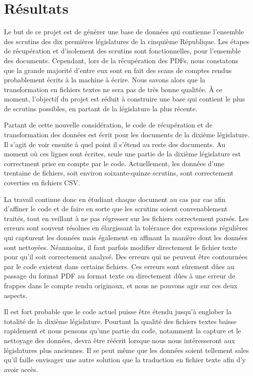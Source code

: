 \section{Résultats}

Le but de ce projet est de générer une base de données qui contienne l'ensemble des scrutins des dix premières législatures de la cinquième République. Les étapes de récupération et d'isolement des scrutins sont fonctionnelles, pour l'ensemble des documents. Cependant, lors de la récupération des PDFs, nous constatons que la grande majorité d'entre eux sont en fait des scans de comptes rendus probablement écrits à la machine à écrire. Nous savons alors que la transformation en fichiers textes ne sera pas de très bonne qualitée. À ce moment, l'objectif du projet est réduit à construire une base qui contient le plus de scrutins possibles, en partant de la législature la plus récente.

Partant de cette nouvelle considération, le code de récupération et de transformation des données est écrit pour les documents de la dixième législature. Il s'agit de voir ensuite à quel point il s'étend au reste des documents. Au moment où ces lignes sont écrites, seule une partie de la dixième législature est correctment prise en compte par le code. Actuellement, les données d'une trentaine de fichiers, soit environ soixante-quinze scrutins, sont correctement coverties en fichiers CSV.

La travail continue donc en étudiant chaque document au cas par cas afin d'affiner le code et de faire en sorte que les scrutins soient convenablement traités, tout en veillant à ne pas régresser sur les fichiers correctement parsés. Les erreurs sont souvent résolues en élargissant la tolérance des expressions régulières qui capturent les données mais également en affinant la manière dont les données sont nettoyées. Néanmoins, il faut parfois modifier directement le fichier texte pour qu'il soit correctement analysé. Des erreurs qui ne peuvent être contournées par le code existent dans certains fichiers. Ces erreurs sont sûrement dûes au passage du format PDF au format texte ou directement dûes à une erreur de frappes dans le compte rendu originaux, et nous ne pouvons agir sur ces deux aspects.

Il est fort probable que le code actuel puisse être étendu jusqu'à englober la totalité de la dixième législature. Pourtant la qualité des fichiers textes baisse rapidement et nous pensons qu'une partie du code, notamment la capture et le nettoyage des données, devra être réécrit lorsque nous nous intéresseront aux législatures plus anciennes. Il se peut même que les données soient tellement sales qu'il faille envisager une autre solution que la traduction en fichier texte afin d'y avoir accès.
